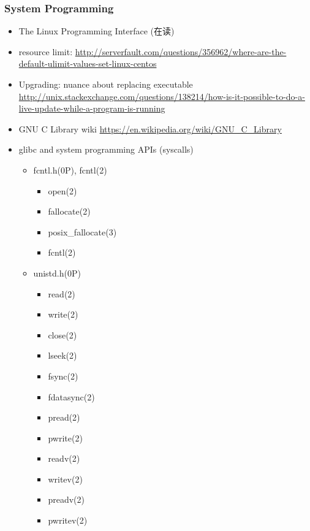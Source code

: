 \documentclass{article}
\begin{document}
\subsubsection{System Programming}
%
\begin{itemize}
    \item The Linux Programming Interface (在读)
    \item resource limit: \url{http://serverfault.com/questions/356962/where-are-the-default-ulimit-values-set-linux-centos}
    \item Upgrading: nuance about replacing executable \url{http://unix.stackexchange.com/questions/138214/how-is-it-possible-to-do-a-live-update-while-a-program-is-running}
    \item GNU C Library wiki \url{https://en.wikipedia.org/wiki/GNU_C_Library}
    \item glibc and system programming APIs (syscalls)
        \begin{itemize}
            \item fcntl.h(0P), fcntl(2)
                \begin{itemize}
                    \item open(2)

                    \item fallocate(2)
                    \item posix_fallocate(3)

                    \item fcntl(2)
                \end{itemize}
            \item unistd.h(0P)
                \begin{itemize}
                    \item read(2)
                    \item write(2)
                    \item close(2)
                    \item lseek(2)
                    \item fsync(2)
                    \item fdatasync(2)

                    \item pread(2)
                    \item pwrite(2)
                    \item readv(2)
                    \item writev(2)
                    \item preadv(2)
                    \item pwritev(2)


\end{itemize}
\end{itemize}
\end{itemize}
\end{document}
